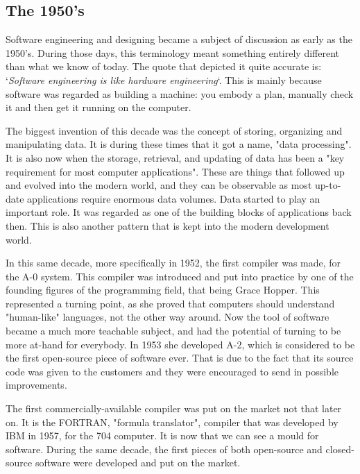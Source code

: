 \subsection{The 1950's}
\par
Software engineering and designing became a subject of discussion as early as the 1950's.
During those days, this terminology meant something entirely different than what we know of today.
The quote that depicted it quite accurate is: `\textit{Software engineering is like hardware engineering}`\cite{boehmb06}.
This is mainly because software was regarded as building a machine: you embody a plan, manually check it and then get it running on the computer.
\par
The biggest invention of this decade was the concept of storing, organizing and manipulating data.
It is during these times that it got a name, "data processing"\cite{firstDBMS}.
It is also now when the storage, retrieval, and updating of data has been a "key requirement for most computer applications"\cite{firstDBMS}.
These are things that followed up and evolved into the modern world, and they can be observable as most up-to-date applications require enormous data volumes.
Data started to play an important role.
It was regarded as one of the building blocks of applications back then.
This is also another pattern that is kept into the modern development world.
\par
In this same decade, more specifically in 1952, the first compiler was made, for the A-0 system.
This compiler was introduced and put into practice by one of the founding figures of the programming field, that being Grace Hopper.
This represented a turning point, as she proved that computers should understand "human-like" languages\cite{a0compiler}, not the other way around.
Now the tool of software became a much more teachable subject, and had the potential of turning to be more at-hand for everybody.
In 1953 she developed A-2, which is considered to be the first open-source piece of software ever.
That is due to the fact that its source code was given to the customers and they were encouraged to send in possible improvements.


\par
The first commercially-available compiler was put on the market not that later on.
It is the FORTRAN, "formula translator"\cite{a0compiler}, compiler that was developed by IBM in 1957, for the 704 computer.
It is now that we can see a mould for software.
During the same decade, the first pieces of both open-source and closed-source software were developed and put on the market.



